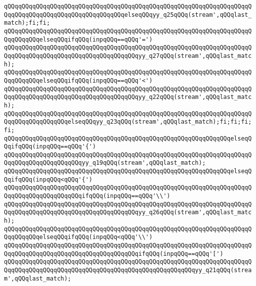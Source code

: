 \verb|qQQqqQQqqQQqqQQqqQQqqQQqqQQqqQQqqQQqqQQqqQQqqQQqqQQqqQQqqQQqqQQqqQQqqQQqqQQqqQQqqQQqqQQqqQQqqQQqqQQqqQQqelseqQQqyy_q25qQQq(stream',qQQqlast_match);fi;fi;|\newline
\verb|qQQqqQQqqQQqqQQqqQQqqQQqqQQqqQQqqQQqqQQqqQQqqQQqqQQqqQQqqQQqqQQqqQQqqQQqqQQqqQQqelseqQQqifqQQq(inpqQQq==qQQq'=')|\newline
\verb|qQQqqQQqqQQqqQQqqQQqqQQqqQQqqQQqqQQqqQQqqQQqqQQqqQQqqQQqqQQqqQQqqQQqqQQqqQQqqQQqqQQqqQQqqQQqqQQqqQQqqQQqqQQqyy_q27qQQq(stream',qQQqlast_match);|\newline
\verb|qQQqqQQqqQQqqQQqqQQqqQQqqQQqqQQqqQQqqQQqqQQqqQQqqQQqqQQqqQQqqQQqqQQqqQQqqQQqqQQqelseqQQqifqQQq(inpqQQq==qQQq'<')|\newline
\verb|qQQqqQQqqQQqqQQqqQQqqQQqqQQqqQQqqQQqqQQqqQQqqQQqqQQqqQQqqQQqqQQqqQQqqQQqqQQqqQQqqQQqqQQqqQQqqQQqqQQqqQQqqQQqyy_q22qQQq(stream',qQQqlast_match);|\newline
\verb|qQQqqQQqqQQqqQQqqQQqqQQqqQQqqQQqqQQqqQQqqQQqqQQqqQQqqQQqqQQqqQQqqQQqqQQqqQQqqQQqqQQqqQQqelseqQQqyy_q23qQQq(stream',qQQqlast_match);fi;fi;fi;fi;|\newline
\verb|qQQqqQQqqQQqqQQqqQQqqQQqqQQqqQQqqQQqqQQqqQQqqQQqqQQqqQQqqQQqqQQqelseqQQqifqQQq(inpqQQq==qQQq'{')|\newline
\verb|qQQqqQQqqQQqqQQqqQQqqQQqqQQqqQQqqQQqqQQqqQQqqQQqqQQqqQQqqQQqqQQqqQQqqQQqqQQqqQQqqQQqqQQqqQQqyy_q19qQQq(stream',qQQqlast_match);|\newline
\verb|qQQqqQQqqQQqqQQqqQQqqQQqqQQqqQQqqQQqqQQqqQQqqQQqqQQqqQQqqQQqqQQqelseqQQqifqQQq(inpqQQq<qQQq'{')|\newline
\verb|qQQqqQQqqQQqqQQqqQQqqQQqqQQqqQQqqQQqqQQqqQQqqQQqqQQqqQQqqQQqqQQqqQQqqQQqqQQqqQQqqQQqqQQqqQQqifqQQq(inpqQQq==qQQq'\\')|\newline
\verb|qQQqqQQqqQQqqQQqqQQqqQQqqQQqqQQqqQQqqQQqqQQqqQQqqQQqqQQqqQQqqQQqqQQqqQQqqQQqqQQqqQQqqQQqqQQqqQQqqQQqqQQqqQQqyy_q26qQQq(stream',qQQqlast_match);|\newline
\verb|qQQqqQQqqQQqqQQqqQQqqQQqqQQqqQQqqQQqqQQqqQQqqQQqqQQqqQQqqQQqqQQqqQQqqQQqqQQqqQQqelseqQQqifqQQq(inpqQQq<qQQq'\\')|\newline
\verb|qQQqqQQqqQQqqQQqqQQqqQQqqQQqqQQqqQQqqQQqqQQqqQQqqQQqqQQqqQQqqQQqqQQqqQQqqQQqqQQqqQQqqQQqqQQqqQQqqQQqqQQqqQQqifqQQq(inpqQQq==qQQq'[')|\newline
\verb|qQQqqQQqqQQqqQQqqQQqqQQqqQQqqQQqqQQqqQQqqQQqqQQqqQQqqQQqqQQqqQQqqQQqqQQqqQQqqQQqqQQqqQQqqQQqqQQqqQQqqQQqqQQqqQQqqQQqqQQqqQQqyy_q21qQQq(stream',qQQqlast_match);|\newline
